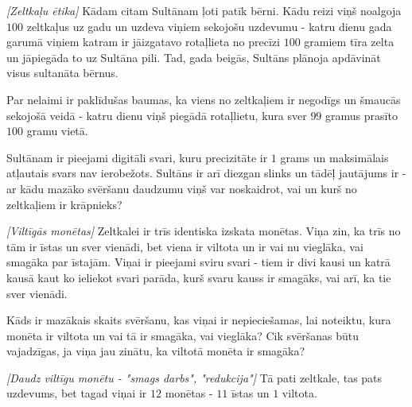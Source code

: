 




\noindent 

\begin{problem}
\textit{[Zeltkaļu ētika]}
Kādam citam Sultānam ļoti patīk bērni. Kādu reizi viņš noalgoja $100$ zeltkaļus uz gadu un uzdeva viņiem sekojošu uzdevumu - katru dienu gada garumā viņiem katram ir jāizgatavo rotaļlieta no precīzi $100$ gramiem tīra zelta un jāpiegāda to uz Sultāna pili. Tad, gada beigās, Sultāns plānoja apdāvināt visus sultanāta bērnus. 

Par nelaimi ir paklīdušas baumas, ka viens no zeltkaļiem ir negodīgs un šmaucās sekojošā veidā - katru dienu viņš piegādā rotaļlietu, kura sver $99$ gramus prasīto $100$ gramu vietā.

Sultānam ir pieejami digitāli svari, kuru precizitāte ir $1$ grams un maksimālais atļautais svars nav ierobežots. Sultāns ir arī diezgan slinks un tādēļ jautājums ir - ar kādu mazāko svēršanu daudzumu viņš var noskaidrot, vai un kurš no zeltkaļiem ir krāpnieks?
\end{problem}
%

\begin{problem}
\textit{[Viltīgās monētas]}
Zeltkalei ir trīs identiska izskata monētas. Viņa zin, ka trīs no tām ir īstas un sver vienādi, bet viena ir viltota un ir vai nu vieglāka, vai smagāka par īstajām. 
Viņai ir pieejami sviru svari - tiem ir divi kausi un katrā kausā kaut ko ieliekot svari parāda, kurš svaru kauss ir smagāks, vai arī, ka tie sver vienādi.

Kāds ir mazākais skaits svēršanu, kas viņai ir nepieciešamas, lai noteiktu, kura monēta ir viltota un vai tā ir smagāka, vai vieglāka? Cik svēršanas būtu vajadzīgas, ja viņa jau zinātu, ka viltotā monēta ir smagāka?

\end{problem}
%

\begin{problem}
\textit{[Daudz viltīgu monētu - "smags darbs", "redukcija"]}
Tā pati zeltkale, tas pats uzdevums, bet tagad viņai ir $12$ monētas - $11$ īstas un $1$ viltota. 
\end{problem}
%


